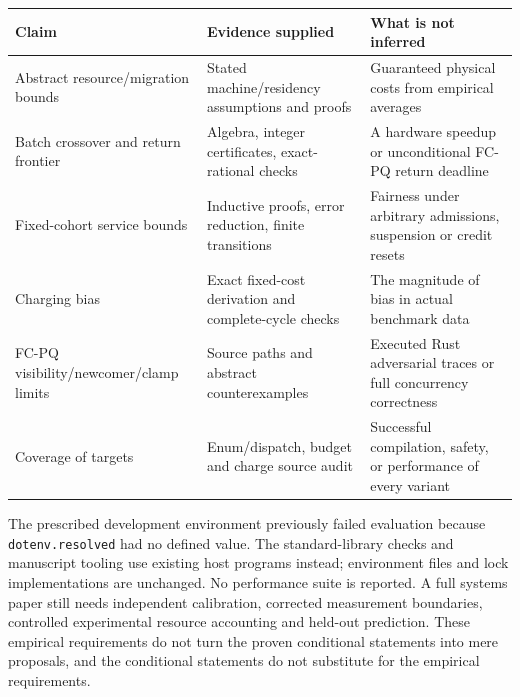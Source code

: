 \begin{center}\small
\begin{tabular}{@{}P{0.22\textwidth}P{0.33\textwidth}P{0.36\textwidth}@{}}
\toprule
Claim & Evidence supplied & What is not inferred \\
\midrule
Abstract resource/migration bounds & Stated machine/residency assumptions and proofs & Guaranteed physical costs from empirical averages \\
Batch crossover and return frontier & Algebra, integer certificates, exact-rational checks & A hardware speedup or unconditional FC-PQ return deadline \\
Fixed-cohort service bounds & Inductive proofs, error reduction, finite transitions & Fairness under arbitrary admissions, suspension or credit resets \\
Charging bias & Exact fixed-cost derivation and complete-cycle checks & The magnitude of bias in actual benchmark data \\
FC-PQ visibility/newcomer/clamp limits & Source paths and abstract counterexamples & Executed Rust adversarial traces or full concurrency correctness \\
Coverage of targets & Enum/dispatch, budget and charge source audit & Successful compilation, safety, or performance of every variant \\
\bottomrule
\end{tabular}
\end{center}

The prescribed development environment previously failed evaluation because
\texttt{dotenv.resolved} had no defined value. The standard-library checks
and manuscript tooling use existing host programs instead; environment files
and lock implementations are unchanged. No performance suite is reported.
A full systems paper still needs independent calibration, corrected
measurement boundaries, controlled experimental resource accounting and
held-out prediction. These empirical requirements do not turn the proven
conditional statements into mere proposals, and the conditional statements
do not substitute for the empirical requirements.
